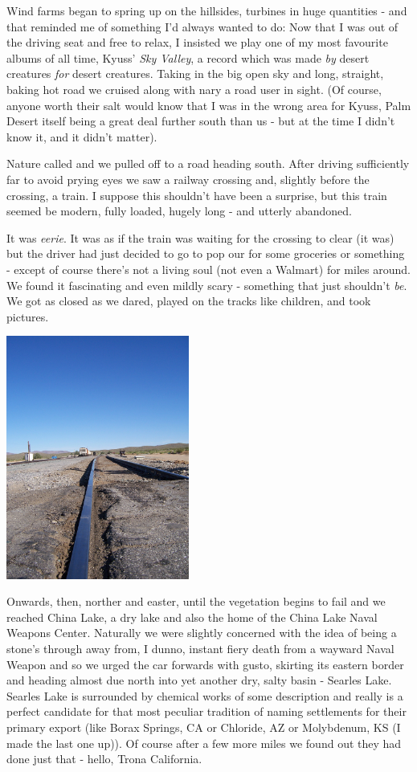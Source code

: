 \documentclass[a5paper,titlepage,11pt]{book}
\begin{document}
Wind farms began to spring up on the hillsides, turbines in huge quantities - and that reminded me of something I'd always wanted to do:  Now that I was out of the driving seat and free to relax, I insisted we play one of my most favourite albums of all time, Kyuss' \emph{Sky Valley}, a record which was made \emph{by} desert creatures \emph{for} desert creatures.  Taking in the big open sky and long, straight, baking hot road we cruised along with nary a road user in sight.  (Of course, anyone worth their salt would know that I was in the wrong area for Kyuss, Palm Desert itself being a great deal further south than us - but at the time I didn't know it, and it didn't matter).

Nature called and we pulled off to a road heading south.  After driving sufficiently far to avoid prying eyes we saw a railway crossing and, slightly before the crossing, a train. I suppose this shouldn't have been a surprise, but this train seemed be modern, fully loaded, hugely long - and utterly abandoned.

It was \emph{eerie}.  It was as if the train was waiting for the crossing to clear (it was) but the driver had just decided to go to pop our for some groceries or something - except of course there's not a living soul (not even a Walmart) for miles around.  We found it fascinating and even mildly scary - something that just shouldn't \emph{be}.  We got as closed as we dared, played on the tracks like children, and took pictures.

\begin{center}\includegraphics[height=80mm]{gfx/100_1346}\end{center}

Onwards, then, norther and easter, until the vegetation begins to fail and we reached China Lake, a dry lake and also the home of the China Lake Naval Weapons Center.  Naturally we were slightly concerned with the idea of being a stone's through away from, I dunno, instant fiery death from a wayward Naval Weapon and so we urged the car forwards with gusto, skirting its eastern border and heading almost due north into yet another dry, salty basin - Searles Lake.  Searles Lake is surrounded by chemical works of some description and really is a perfect candidate for that most peculiar tradition of naming settlements for their primary export (like Borax Springs, CA or Chloride, AZ or Molybdenum, KS (I made the last one up)).  Of course after a few more miles we found out they had done just that - hello, Trona California.
\end{document}
